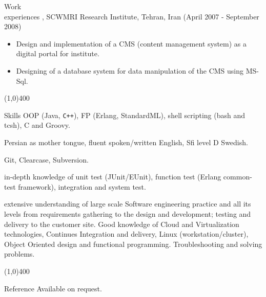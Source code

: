 \documentclass{resume}
\begin{document}
\begin{category}{Work \\experiences}
, SCWMRI Research Institute, 
Tehran, Iran (April 2007 - September 2008)
\begin{itemize} 
\item Design and implementation of a CMS (content management system) as a 
 digital portal for institute.
\item Designing of a database system for data manipulation of the CMS using MS-Sql.
\end{itemize}

\end{category}

\begin{center}
\line(1,0){400}
\end{center}
\begin{category}{Skills}
\hspace{1 mm}OOP (Java, \texttt{C++}), FP (Erlang, StandardML), 
shell scripting (bash and tcsh), C and Groovy.

\hspace{1 mm}Persian as mother tongue, fluent spoken/written English,
Sfi level D Swedish.

\hspace{1 mm}Git, Clearcase, Subversion. 

\hspace{1 mm}in-depth knowledge of unit 
test (JUnit/EUnit), function test (Erlang common-test framework), integration 
and system test.

\hspace{1 mm}extensive understanding of large scale 
Software engineering practice and all its levels from requirements gathering 
to the design and development; testing and delivery to the customer site. 
Good knowledge of Cloud and Virtualization technologies, Continues Integration and delivery, 
Linux (workstation/cluster), Object Oriented design and functional programming.
Troubleshooting and solving problems.

\end{category}

\begin{center}
\line(1,0){400}
\end{center}


\begin{category}{Reference} 
\citemnobullet Available on request.
\end{category}
\end{document}
